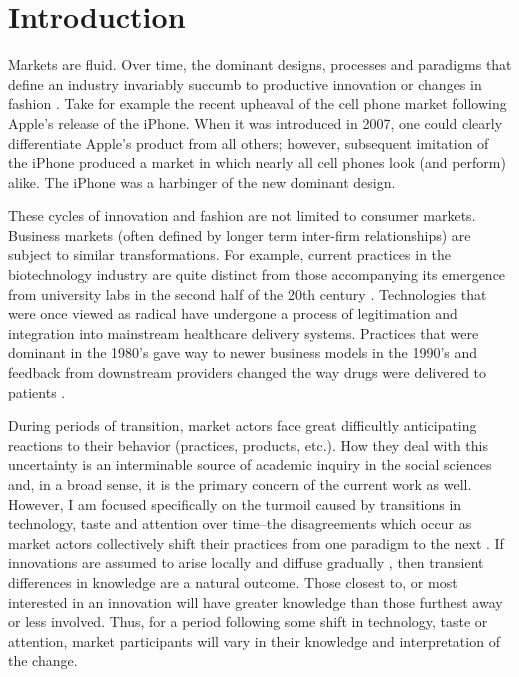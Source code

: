 \chapter{Introduction\label{intro}}

Markets are fluid. Over time, the dominant designs, processes and paradigms that define an industry invariably succumb to productive innovation or changes in fashion \citep{arthur2009, schumpeter1934, simmel1957}. Take for example the recent upheaval of the cell phone market following Apple's release of the iPhone. When it was introduced in 2007, one could clearly differentiate Apple's product from all others; however, subsequent imitation of the iPhone produced a market in which nearly all cell phones look (and perform) alike. The iPhone was a harbinger of the new dominant design.

These cycles of innovation and fashion are not limited to consumer markets. Business markets (often defined by longer term inter-firm relationships) are subject to similar transformations. For example, current practices in the biotechnology industry are quite distinct from those accompanying its emergence from university labs in the second half of the 20th century \citep{powell2005}. Technologies that were once viewed as radical have undergone a process of legitimation and integration into mainstream healthcare delivery systems. Practices that were dominant in the 1980's gave way to newer business models in the 1990's and feedback from downstream providers changed the way drugs were delivered to patients \citep{wolff2001}. 

During periods of transition, market actors face great difficultly anticipating reactions to their behavior (practices, products, etc.). How they deal with this uncertainty is an interminable source of academic inquiry in the social sciences \citep[see e.g.][]{alderson1965a, simon1957, thompson1967} and, in a broad sense, it is the primary concern of the current work as well. However, I am focused specifically on the turmoil caused by transitions in technology, taste and attention over time--the disagreements which occur as market actors collectively shift their practices from one paradigm to the next \citep{powell2008}. If innovations are assumed to arise locally and diffuse gradually \citep[see e.g.][]{bass1969, rogers2002}, then transient differences in knowledge are a natural outcome. Those closest to, or most interested in an innovation will have greater knowledge than those furthest away or less involved. Thus, for a period following some shift in technology, taste or attention, market participants will vary in their knowledge and interpretation of the change.

